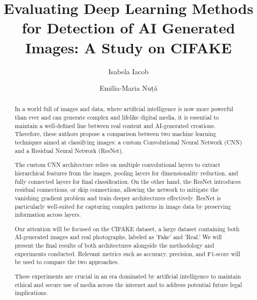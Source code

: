 \documentclass[runningheads]{llncs}
\begin{document}
%
\title{Evaluating Deep Learning Methods for Detection of AI Generated Images: A Study on CIFAKE}
%
%
\author{Isabela Iacob \and Emilia-Maria Nuță}
%
%
%
\maketitle              %
%
\begin{abstract}

In a world full of images and data, where artificial intelligence is now more powerful than ever and can generate complex and lifelike digital media, it is essential to maintain a well-defined line between real content and AI-generated creations. Therefore, these authors propose a comparison between two machine learning techniques aimed at classifying images: a custom Convolutional Neural Network (CNN) and a Residual Neural Network (ResNet).

The custom CNN architecture relies on multiple convolutional layers to extract hierarchical features from the images, pooling layers for dimensionality reduction, and fully connected layers for final classification. On the other hand, the ResNet introduces residual connections, or skip connections, allowing the network to mitigate the vanishing gradient problem and train deeper architectures effectively. ResNet is particularly well-suited for capturing complex patterns in image data by preserving information across layers.

Our attention will be focused on the CIFAKE dataset, a large dataset containing both AI-generated images and real photographs, labeled as 'Fake' and 'Real.' We will present the final results of both architectures alongside the methodology and experiments conducted. Relevant metrics such as accuracy, precision, and F1-score will be used to compare the two approaches.

These experiments are crucial in an era dominated by artificial intelligence to maintain ethical and secure use of media across the internet and to address potential future legal implications.


\end{abstract}
%
%
%
\end{document}
